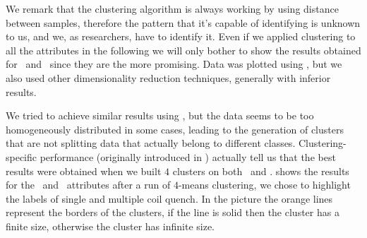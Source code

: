 We remark that the clustering algorithm is always working by using distance between samples,
therefore the pattern that it's capable of identifying is unknown to us, and we, as researchers,
have to identify it. Even if we applied clustering to all the attributes in the following we will
only bother to show the results obtained for \an\ and \cnmod\ since they are the more promising.
Data was plotted using \pca, but we also used other dimensionality reduction techniques, generally
with inferior results.

We tried to achieve similar results using \cnmod, but the data seems to be too homogeneously
distributed in some cases, leading to the generation of clusters that are not splitting data that
actually belong to different classes. Clustering-specific performance (originally introduced in
) actually tell us that the best results were obtained when we built $4$ clusters on
both \an\ and \cnmod.  shows the results for the \an\ and \cnmod\
attributes after a run of $4$-means clustering, we chose to highlight the labels of single and
multiple coil quench. In the picture the orange lines represent the borders
of the clusters, if the line is solid then the cluster has a finite size, otherwise the cluster has
infinite size.

